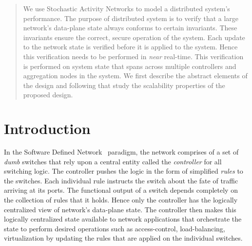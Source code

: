 \documentclass[conference]{IEEEtran}
\begin{document}
\begin{abstract}

We use Stochastic Activity Networks to model a distributed system's performance. The purpose of distributed system is to verify that a large network's data-plane state always conforms to certain invariants. These invariants ensure the correct, secure operation of the system. Each update to the network state is verified before it is applied to the system. Hence this verification needs to be performed in \textit{near} real-time. This verification is performed on system state that spans across multiple controllers and aggregation nodes in the system. We first describe the abstract elements of the design and following that study the scalability properties of the proposed design.

\end{abstract}





%
\IEEEpeerreviewmaketitle


\section{Introduction}

In the Software Defined Network~\cite{openflow} paradigm, the network comprises of a set of \textit{dumb} switches that rely upon a central entity called the \textit{controller} for all switching logic. The controller pushes the logic in the form of simplified \textit{rules} to the switches. Each individual rule instructs the switch  about the fate of traffic arriving at its ports. The functional output of a switch depends completely on the collection of rules that it holds. Hence only the controller has the logically centralized view of network's data-plane state. The controller then makes this logically centralized state available to network applications that orchestrate the state to perform desired operations such as access-control, load-balancing, virtualization by updating the rules that are applied on the individual switches.
\end{document}

